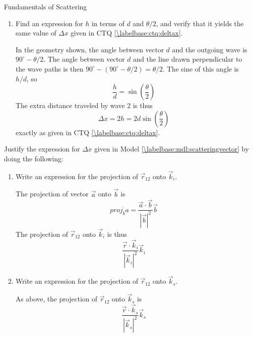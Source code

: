 \begin{activity}{Fundamentals of Scattering}
\begin{exercises}
\begin{enumerate}
		\item Find an expression for $h$ in terms of $d$ and $\theta/2$, and verify that it yields the same value of $\Delta x$ given in CTQ \ref{\labelbase:ctq:deltax}.
		
			\begin{solution}{}
				In the geometry shown, the angle between vector $d$ and the outgoing wave is $90^\circ-\theta/2$.  The angle between vector $d$ and the line drawn perpendicular to the wave paths is then $90^\circ - (90^\circ-\theta/2) = \theta/2$.  The sine of this angle is $h/d$, so
				\begin{equation*}
					\frac{h}{d} = \sin\left(\frac{\theta}{2}\right)
				\end{equation*}
				The extra distance traveled by wave 2 is thus
				\begin{equation*}
					\Delta x = 2h = 2 d\sin\left(\frac{\theta}{2}\right)
				\end{equation*}
				exactly as given in CTQ \ref{\labelbase:ctq:deltax}.
			\end{solution}
	\end{enumerate}

	\exercise Justify the expression for $\Delta x$ given in Model \ref{\labelbase:mdl:scatteringvector} by doing the following: \label{\labelbase:exc:scatteringvector}
	
		\begin{enumerate}
			\item Write an expression for the projection of $\vec r_{12}$ onto $\vec k_i$.
			
				\begin{solution}{}
					The projection of vector $\vec a$ onto $\vec b$ is
					\begin{equation*}
						proj_b a = \frac{\vec a \cdot \vec b}{|\vec b|^2} \vec b
					\end{equation*}
					The projection of $\vec r_{12}$ onto $\vec k_i$ is thus
					\begin{equation*}
						\frac{\vec r \cdot \vec k_i}{|\vec k_i|^2} \vec k_i
					\end{equation*}
				\end{solution}
				
			\item Write an expression for the projection of $\vec r_{12}$ onto $\vec k_s$.
			
				\begin{solution}{}
					As above, the projection of $\vec r_{12}$ onto $\vec k_s$ is
					\begin{equation*}
						\frac{\vec r \cdot \vec k_s}{|\vec k_s|^2} \vec k_s
					\end{equation*}
				\end{solution}
			

\end{enumerate}
\end{exercises}
\end{activity}
